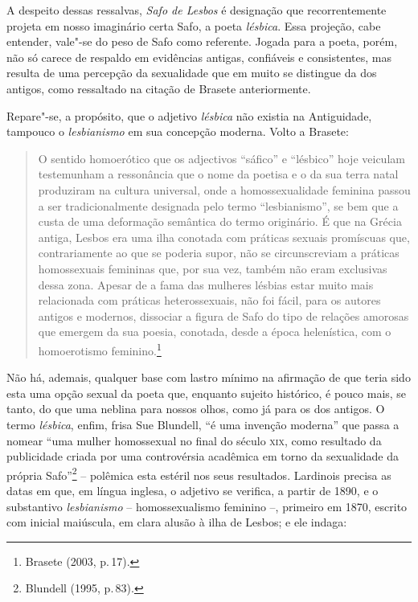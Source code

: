 A despeito dessas ressalvas, \textit{Safo de Lesbos} é designação que
recorrentemente projeta em nosso imaginário certa Safo, a poeta
\textit{lésbica}. Essa projeção, cabe entender, vale"-se do peso de Safo como referente. 
Jogada para a poeta, porém, não só carece de respaldo em evidências antigas,
confiáveis e consistentes, mas resulta de uma percepção da
sexualidade que em muito se distingue da dos antigos, como ressaltado na citação de Brasete anteriormente.

Repare"-se, a propósito, que o adjetivo \textit{lésbica} não existia na
Antiguidade, tampouco o \textit{lesbianismo} em sua concepção moderna.
Volto a Brasete:

\begin{quote}
O sentido homoerótico que os adjectivos ``sáfico'' e ``lésbico'' hoje veiculam testemunham a ressonância que o nome da poetisa e o da sua terra natal produziram na cultura universal, onde a homossexualidade feminina passou a ser tradicionalmente designada pelo termo ``lesbianismo'', se bem que a custa de uma deformação semântica do termo originário. É que na Grécia antiga, Lesbos era uma ilha conotada com práticas sexuais promíscuas que, contrariamente ao que se poderia supor, não se circunscreviam a práticas homossexuais femininas que, por sua vez, também não eram exclusivas dessa zona. Apesar de a fama das mulheres lésbias estar muito mais relacionada com práticas heterossexuais, não foi fácil, para os autores antigos e modernos, dissociar a figura de Safo do tipo de relações amorosas que emergem da sua poesia, conotada, desde a época helenística, com o homoerotismo feminino.\footnote{Brasete (2003, p.\,17).}
\end{quote}

\noindent{}Não há,
ademais, qualquer base com lastro mínimo na afirmação de que teria sido esta
uma opção sexual da poeta que, enquanto sujeito histórico, é pouco mais, se
tanto, do que uma neblina para nossos olhos, como já para os dos antigos. O
termo \textit{lésbica}, enfim, frisa Sue Blundell, “é uma
invenção moderna” que passa a nomear “uma mulher homossexual no final do século
\textsc{xix}, como resultado da publicidade criada por uma controvérsia acadêmica em
torno da sexualidade da própria Safo”\footnote{ Blundell (1995, p.\,83).} -- polêmica esta 
estéril nos seus resultados.
Lardinois precisa as datas em que, em
língua inglesa, o adjetivo se verifica, a partir de 1890, e o substantivo
\textit{lesbianismo} -- homossexualismo feminino --, primeiro em 1870, escrito com
inicial maiúscula, em clara alusão à ilha de Lesbos; e ele indaga:

